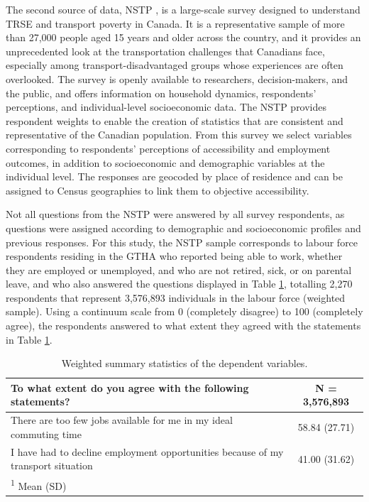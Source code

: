 \documentclass[preprint, 3p,
authoryear]{elsarticle} %
\begin{document}
The second source of data, NSTP \citep{tiznado-aitken}, is a large-scale
survey designed to understand TRSE and transport poverty in Canada. It
is a representative sample of more than 27,000 people aged 15 years and
older across the country, and it provides an unprecedented look at the
transportation challenges that Canadians face, especially among
transport-disadvantaged groups whose experiences are often overlooked.
The survey is openly available to researchers, decision-makers, and the
public, and offers information on household dynamics, respondents'
perceptions, and individual-level socioeconomic data. The NSTP provides
respondent weights to enable the creation of statistics that are
consistent and representative of the Canadian population. From this
survey we select variables corresponding to respondents' perceptions of
accessibility and employment outcomes, in addition to socioeconomic and
demographic variables at the individual level. The responses are
geocoded by place of residence and can be assigned to Census geographies
to link them to objective accessibility.

Not all questions from the NSTP were answered by all survey respondents,
as questions were assigned according to demographic and socioeconomic
profiles and previous responses. For this study, the NSTP sample
corresponds to labour force respondents residing in the GTHA who
reported being able to work, whether they are employed or unemployed,
and who are not retired, sick, or on parental leave, and who also
answered the questions displayed in Table \ref{tab:out-description},
totalling 2,270 respondents that represent 3,576,893 individuals in the
labour force (weighted sample). Using a continuum scale from 0
(completely disagree) to 100 (completely agree), the respondents
answered to what extent they agreed with the statements in Table
\ref{tab:out-description}.

\begin{table}
\centering
\caption{\label{tab:unnamed-chunk-1}\label{tab:out-description}Weighted summary statistics of the dependent variables.}
\centering
\fontsize{10}{12}\selectfont
\begin{tabular}[t]{lc}
\toprule
To what extent do you agree with the following statements? & \textbf{N = 3,576,893}\\
\midrule
There are too few jobs available for me in my ideal commuting time & 58.84 (27.71)\\
I have had to decline employment opportunities because of my transport situation & 41.00 (31.62)\\
\bottomrule
\multicolumn{2}{l}{\rule{0pt}{1em}\textsuperscript{1} Mean (SD)}\\
\end{tabular}
\end{table}
\end{document}
